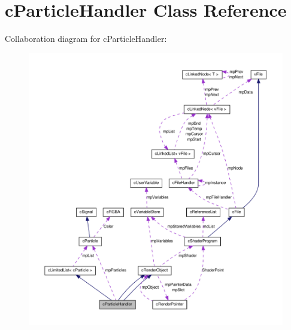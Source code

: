 \hypertarget{classc_particle_handler}{
\section{cParticleHandler Class Reference}
\label{classc_particle_handler}
}


Collaboration diagram for cParticleHandler:\nopagebreak
\begin{figure}[H]
\begin{center}
\leavevmode
\includegraphics[width=400pt]{classc_particle_handler__coll__graph}
\end{center}
\end{figure}
